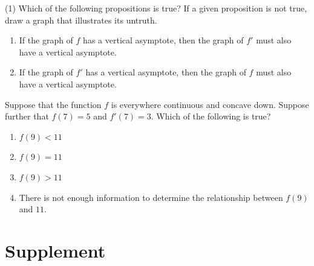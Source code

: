 \documentclass[10pt,oneside,]{book}
\newcommand{\lt}{<}
\newcommand{\gt}{>}
\theoremstyle{plain}
\theoremstyle{definition}
\numberwithin{equation}{section}
\newcommand{\fe}[2]{#1\mathopen{}\left(#2\right)\mathclose{}}
\newcommand{\fd}[1]{#1'}
\begin{document}
\begin{exercisegroup}(1)
\exercise[19.]\hypertarget{exercise-296}{\null}Which of the following propositions is true? If a given proposition is not true, draw a graph that illustrates its untruth.%
\begin{multicols}{2}
\begin{enumerate}[label=(\alph*)]
\item{}If the graph of \(f\) has a vertical asymptote, then the graph of \(\fd{f}\) must also have a vertical asymptote.\item{}If the graph of \(\fd{f}\) has a vertical asymptote, then the graph of \(f\) must also have a vertical asymptote.\end{enumerate}
\end{multicols}
\exercise[20.]\hypertarget{exercise-297}{\null}Suppose that the function \(f\) is everywhere continuous and concave down.  Suppose further that \(\fe{f}{7}=5\) and \(\fe{\fd{f}}{7}=3\).  Which of the following is true?%
\begin{multicols}{2}
\begin{enumerate}[label=(\alph*)]
\item{}\(\fe{f}{9}\lt11\)\item{}\(\fe{f}{9}=11\)\item{}\(\fe{f}{9}\gt11\)\item{}There is not enough information to determine the relationship between \(\fe{f}{9}\) and \(11\).\end{enumerate}
\end{multicols}
\end{exercisegroup}
\par\smallskip\noindent
\typeout{************************************************}
\typeout{************************************************}
\section[Supplement]{Supplement}\label{functions-derivatives-antiderivatives-supplementary-exercises}
\typeout{************************************************}
\typeout{************************************************}
\end{document}
